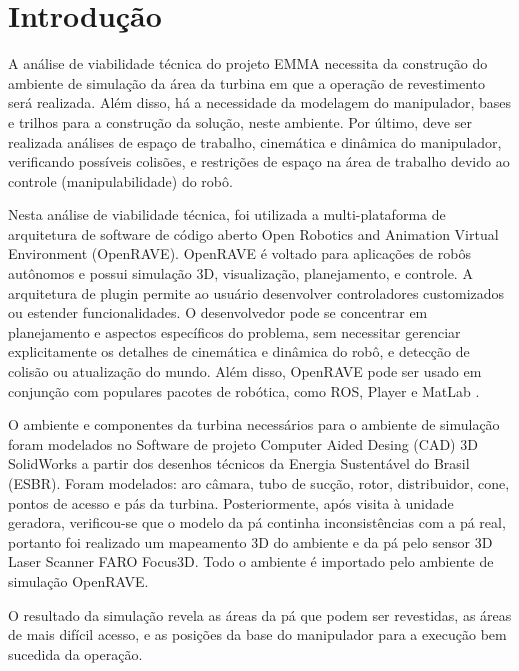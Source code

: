 \section{Introdução}
A análise de viabilidade técnica do projeto EMMA necessita da construção do
ambiente de simulação da área da turbina em que a operação de revestimento será
realizada. Além disso, há a necessidade da modelagem do manipulador, bases e
trilhos para a construção da solução, neste ambiente. Por último, deve ser
realizada análises de espaço de trabalho, cinemática e dinâmica do manipulador,
verificando possíveis colisões, e restrições de espaço na área de trabalho
devido ao controle (manipulabilidade) do robô. 

Nesta análise de viabilidade técnica, foi utilizada a 
multi-plataforma de arquitetura de software de código aberto Open
Robotics and Animation Virtual Environment (OpenRAVE). OpenRAVE é voltado para
aplicações de robôs autônomos e possui simulação 3D, visualização, planejamento,
e controle. A arquitetura de plugin permite ao usuário desenvolver controladores
customizados ou estender funcionalidades. O desenvolvedor pode se
concentrar em planejamento e aspectos específicos do problema, sem necessitar
gerenciar explicitamente os detalhes de cinemática e dinâmica do robô, e
detecção de colisão ou atualização do mundo. Além disso, OpenRAVE pode ser usado
em conjunção com populares pacotes de robótica, como ROS, Player e MatLab
\cite{diankov2008openrave}. 

O ambiente e componentes da turbina necessários para o ambiente de simulação
foram modelados no Software de projeto Computer Aided Desing (CAD) 3D SolidWorks
a partir dos desenhos técnicos da Energia Sustentável do Brasil (ESBR). Foram modelados: aro câmara,
tubo de sucção, rotor, distribuidor, cone, pontos de acesso e pás da turbina.
Posteriormente, após visita à unidade geradora, verificou-se que o modelo da pá
continha inconsistências com a pá real, portanto foi realizado um mapeamento 3D
do ambiente e da pá pelo sensor 3D Laser Scanner FARO Focus3D. Todo o ambiente é
importado pelo ambiente de simulação OpenRAVE.

O resultado da simulação revela as áreas da pá que podem ser revestidas, as
áreas de mais difícil acesso, e as posições da base do manipulador para a
execução bem sucedida da operação.